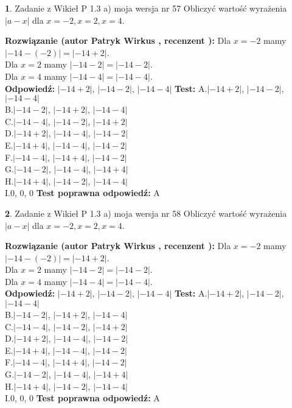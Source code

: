 \documentclass[12pt, a4paper]{article}
\theoremstyle{definition} %
\newtheorem{zad}{}
\newcommand{\zadStart}[1]{\begin{zad}#1\newline}
\newcommand{\zadStop}{\end{zad}}
\newcommand{\rozwStart}[2]{\noindent \textbf{Rozwiązanie (autor #1 , recenzent #2): }\newline}
\newcommand{\rozwStop}{\newline}
\newcommand{\odpStart}{\noindent \textbf{Odpowiedź:}\newline}
\newcommand{\odpStop}{\newline}
\newcommand{\testStart}{\noindent \textbf{Test:}\newline}
\newcommand{\testStop}{\newline}
\newcommand{\kluczStart}{\noindent \textbf{Test poprawna odpowiedź:}\newline}
\newcommand{\kluczStop}{\newline}
\begin{document}
\zadStart{Zadanie z Wikieł P 1.3 a) moja wersja nr 57}
Obliczyć wartość wyrażenia $|a - x|$ dla $x=-2,x=2,x=4$.
\zadStop
\rozwStart{Patryk Wirkus}{}
Dla $x = -2$ mamy $|-14 - (-2)| = |-14 + 2|$.\\
Dla $x = 2$ mamy $|-14 - 2| = |-14 - 2|$.\\
Dla $x = 4$ mamy $|-14 - 4| = |-14 - 4|$.\\
\rozwStop
\odpStart
$|-14 + 2|$, $|-14 - 2|$, $|-14 - 4|$
\odpStop
\testStart
A.$|-14 + 2|$, $|-14 - 2|$, $|-14 - 4|$\\
B.$|-14 - 2|$, $|-14 + 2|$, $|-14 - 4|$\\
C.$|-14 - 4|$, $|-14 - 2|$, $|-14 + 2|$\\
D.$|-14 + 2|$, $|-14 - 4|$, $|-14 - 2|$\\
E.$|-14 + 4|$, $|-14 - 4|$, $|-14 - 2|$\\
F.$|-14 - 4|$, $|-14 + 4|$, $|-14 - 2|$\\
G.$|-14 - 2|$, $|-14 - 4|$, $|-14 + 4|$\\
H.$|-14 + 4|$, $|-14 - 2|$, $|-14 - 4|$\\
I.$0$, $0$, $0$
\testStop
\kluczStart
A
\kluczStop



\zadStart{Zadanie z Wikieł P 1.3 a) moja wersja nr 58}
Obliczyć wartość wyrażenia $|a - x|$ dla $x=-2,x=2,x=4$.
\zadStop
\rozwStart{Patryk Wirkus}{}
Dla $x = -2$ mamy $|-14 - (-2)| = |-14 + 2|$.\\
Dla $x = 2$ mamy $|-14 - 2| = |-14 - 2|$.\\
Dla $x = 4$ mamy $|-14 - 4| = |-14 - 4|$.\\
\rozwStop
\odpStart
$|-14 + 2|$, $|-14 - 2|$, $|-14 - 4|$
\odpStop
\testStart
A.$|-14 + 2|$, $|-14 - 2|$, $|-14 - 4|$\\
B.$|-14 - 2|$, $|-14 + 2|$, $|-14 - 4|$\\
C.$|-14 - 4|$, $|-14 - 2|$, $|-14 + 2|$\\
D.$|-14 + 2|$, $|-14 - 4|$, $|-14 - 2|$\\
E.$|-14 + 4|$, $|-14 - 4|$, $|-14 - 2|$\\
F.$|-14 - 4|$, $|-14 + 4|$, $|-14 - 2|$\\
G.$|-14 - 2|$, $|-14 - 4|$, $|-14 + 4|$\\
H.$|-14 + 4|$, $|-14 - 2|$, $|-14 - 4|$\\
I.$0$, $0$, $0$
\testStop
\kluczStart
A
\kluczStop
\end{document}
